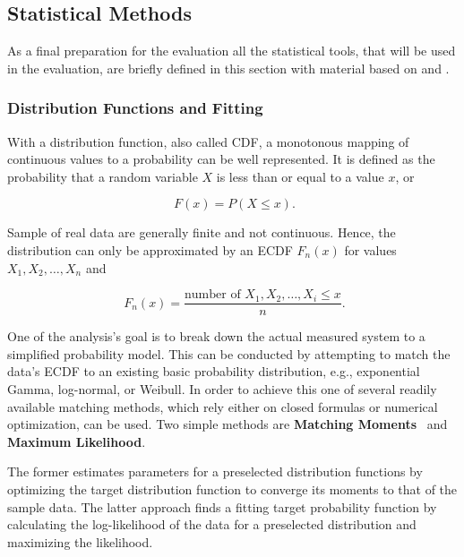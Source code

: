 \subsection{Statistical Methods}

As a final preparation for the evaluation all the statistical tools, that will be used in the evaluation, are briefly defined in this section with material based on \cite{field2012discovering} and \cite{Knuth:1997:ACP:270146}.


\subsubsection{Distribution Functions and Fitting}

With a distribution function, also called \gls{CDF}, a monotonous mapping of continuous values to a probability can be well represented. It is defined as the probability that a random variable $X$ is less than or equal to a value $x$, or

\begin{equation}
	\phantom{.} F(x) = P(X\leq x)\text{.}
\end{equation}

Sample of real data are generally finite and not continuous. Hence, the distribution can only be approximated by an \gls{ECDF} $F_n(x)$ for values $X_1, X_2, \ldots , X_n$ and

\begin{equation}
	\phantom{.}F_n(x) = \frac{\text{number of }X_1, X_2, \ldots , X_i \leq x}{n}\text{.}
\end{equation}

One of the analysis's goal is to break down the actual measured system to a simplified probability model. This can be conducted by attempting to match the data's \gls{ECDF} to an existing basic probability distribution, e.g., exponential Gamma, log-normal, or Weibull. In order to achieve this one of several readily available matching methods, which rely either on closed formulas or numerical optimization, can be used. Two simple methods are \textbf{Matching Moments}~\cite[pp.~99-143]{vose2000risk} and \textbf{Maximum Likelihood}.

The former estimates parameters for a preselected distribution functions by optimizing the target distribution function to converge its moments to that of the sample data. The latter approach finds a fitting target probability function by calculating the log-likelihood of the data for a preselected distribution and maximizing the likelihood.

